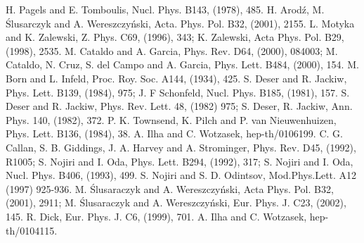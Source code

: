 \documentclass[a4 paper, 12 pt] {article}
\begin{document}
\begin{thebibliography}{25}
 H. Pagels and E. Tomboulis, Nucl. Phys. B143, (1978), 485.
 H. Arod\'{z}, M. \'{S}lusarczyk and A. Wereszczy\'{n}ski, Acta.
Phys. Pol. B32, (2001), 2155.
 L. Motyka and K. Zalewski, Z. Phys. C69, (1996),
343; K. Zalewski, Acta Phys. Pol. B29, (1998), 2535.
  M. Cataldo and A. Garcia, Phys. Rev. D64, (2000), 084003;
M. Cataldo, N. Cruz, S. del Campo and A. Garcia, Phys. Lett. B484,
(2000), 154.
 M. Born and L. Infeld, Proc. Roy. Soc. A144, (1934),
425.
 S. Deser and R. Jackiw, Phys. Lett. B139, (1984), 975; J. F
Schonfeld, Nucl. Phys. B185, (1981), 157.
 S. Deser and R. Jackiw, Phys. Rev. Lett. 48, (1982) 975; S. Deser, R.
Jackiw, Ann. Phys. 140, (1982), 372.
 P. K. Townsend, K. Pilch and P. van Nieuwenhuizen, Phys.
Lett. B136, (1984), 38.
 A. Ilha and C. Wotzasek, hep-th/0106199.
 C. G. Callan, S. B. Giddings, J. A. Harvey and A.
Strominger, Phys. Rev. D45, (1992), R1005; S. Nojiri and I. Oda,
Phys. Lett. B294, (1992), 317; S. Nojiri and I. Oda, Nucl. Phys.
B406, (1993), 499.
 S. Nojiri and S. D. Odintsov, Mod.Phys.Lett. A12 (1997)
925-936.
 M. \'{S}lusaraczyk and A. Wereszczy\'{n}ski, Acta Phys.
Pol. B32, (2001), 2911;  M. \'{S}lusaraczyk and A.
Wereszczy\'{n}ski, Eur. Phys. J. C23, (2002), 145.
 R. Dick, Eur. Phys. J. C6, (1999), 701.
 A. Ilha and C. Wotzasek, hep-th/0104115.
\end{thebibliography}
\end{document}
